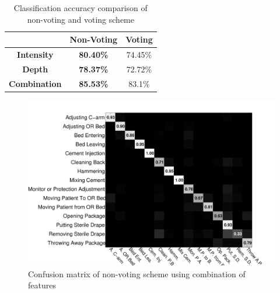     
\begin{table}[H]
\centering
\begin{tabular}{|c|c|c|}
\hline
                  & {\bf Non-Voting \cite{twinanda2015data}}   & {\bf Voting} \\ \hline
{\bf Intensity}   & {\bf 80.40\%} & 74.45\%    \\ \hline
{\bf Depth}       & {\bf 78.37\%} & 72.72\%    \\ \hline
{\bf Combination} & {\bf 85.53\%} & 83.1\%     \\ \hline
\end{tabular}
\caption{Classification accuracy comparison of non-voting \cite{twinanda2015data} and voting scheme}
\label{table:comparisonResults}
\end{table}
           


\begin{figure}[H]%
\begin{center}
\includegraphics[scale=0.15]{Figures/confusionAndruPaper1}
\end{center}
\caption{Confusion matrix of non-voting scheme using combination of features\cite{twinanda2015data} 
\label{fig:combinationNonVotingConfusionMatrix}}
\end{figure}

